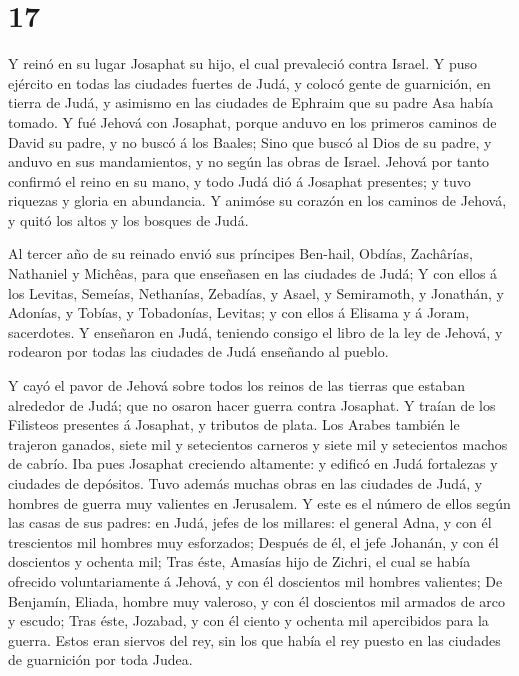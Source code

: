\hypertarget{section-16}{%
\section{17}\label{section-16}}

 Y reinó en su lugar Josaphat su hijo, el cual prevaleció
contra Israel.  Y puso ejército en todas las ciudades
fuertes de Judá, y colocó gente de guarnición, en tierra de Judá, y
asimismo en las ciudades de Ephraim que su padre Asa había tomado.
 Y fué Jehová con Josaphat, porque anduvo en los primeros
caminos de David su padre, y no buscó á los Baales;  Sino
que buscó al Dios de su padre, y anduvo en sus mandamientos, y no según
las obras de Israel.  Jehová por tanto confirmó el reino en
su mano, y todo Judá dió á Josaphat presentes; y tuvo riquezas y gloria
en abundancia.  Y animóse su corazón en los caminos de
Jehová, y quitó los altos y los bosques de Judá.

 Al tercer año de su reinado envió sus príncipes Ben-hail,
Obdías, Zachârías, Nathaniel y Michêas, para que enseñasen en las
ciudades de Judá;  Y con ellos á los Levitas, Semeías,
Nethanías, Zebadías, y Asael, y Semiramoth, y Jonathán, y Adonías, y
Tobías, y Tobadonías, Levitas; y con ellos á Elisama y á Joram,
sacerdotes.  Y enseñaron en Judá, teniendo consigo el libro
de la ley de Jehová, y rodearon por todas las ciudades de Judá enseñando
al pueblo.

 Y cayó el pavor de Jehová sobre todos los reinos de las
tierras que estaban alrededor de Judá; que no osaron hacer guerra contra
Josaphat.  Y traían de los Filisteos presentes á Josaphat,
y tributos de plata. Los Arabes también le trajeron ganados, siete mil y
setecientos carneros y siete mil y setecientos machos de cabrío.
 Iba pues Josaphat creciendo altamente: y edificó en Judá
fortalezas y ciudades de depósitos.  Tuvo además muchas
obras en las ciudades de Judá, y hombres de guerra muy valientes en
Jerusalem.  Y este es el número de ellos según las casas de
sus padres: en Judá, jefes de los millares: el general Adna, y con él
trescientos mil hombres muy esforzados;  Después de él, el
jefe Johanán, y con él doscientos y ochenta mil;  Tras
éste, Amasías hijo de Zichri, el cual se había ofrecido voluntariamente
á Jehová, y con él doscientos mil hombres valientes;  De
Benjamín, Eliada, hombre muy valeroso, y con él doscientos mil armados
de arco y escudo;  Tras éste, Jozabad, y con él ciento y
ochenta mil apercibidos para la guerra.  Estos eran siervos
del rey, sin los que había el rey puesto en las ciudades de guarnición
por toda Judea.

